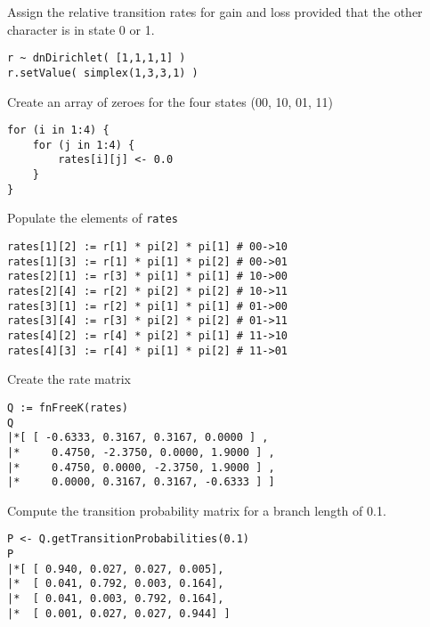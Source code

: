Assign the relative transition rates for gain and loss provided that the other character is in state 0 or 1.

{\tt \begin{snugshade*}
\begin{lstlisting}
r ~ dnDirichlet( [1,1,1,1] )
r.setValue( simplex(1,3,3,1) )
\end{lstlisting}
\end{snugshade*}}

Create an array of zeroes for the four states (00, 10, 01, 11)

{\tt \begin{snugshade*}
\begin{lstlisting}
for (i in 1:4) {
    for (j in 1:4) {
        rates[i][j] <- 0.0
    }
}
\end{lstlisting}
\end{snugshade*}}

Populate the elements of {\tt rates}

{\tt \begin{snugshade*}
\begin{lstlisting}
rates[1][2] := r[1] * pi[2] * pi[1] # 00->10
rates[1][3] := r[1] * pi[1] * pi[2] # 00->01
rates[2][1] := r[3] * pi[1] * pi[1] # 10->00
rates[2][4] := r[2] * pi[2] * pi[2] # 10->11
rates[3][1] := r[2] * pi[1] * pi[1] # 01->00
rates[3][4] := r[3] * pi[2] * pi[2] # 01->11
rates[4][2] := r[4] * pi[2] * pi[1] # 11->10
rates[4][3] := r[4] * pi[1] * pi[2] # 11->01
\end{lstlisting}
\end{snugshade*}}

Create the rate matrix

{\tt \begin{snugshade*}
\begin{lstlisting}
Q := fnFreeK(rates)
Q
|*[ [ -0.6333, 0.3167, 0.3167, 0.0000 ] ,
|*     0.4750, -2.3750, 0.0000, 1.9000 ] ,
|*     0.4750, 0.0000, -2.3750, 1.9000 ] ,
|*     0.0000, 0.3167, 0.3167, -0.6333 ] ]
\end{lstlisting}
\end{snugshade*}}

Compute the transition probability matrix for a branch length of 0.1.

{\tt \begin{snugshade*}
\begin{lstlisting}
P <- Q.getTransitionProbabilities(0.1)
P
|*[ [ 0.940, 0.027, 0.027, 0.005],
|*  [ 0.041, 0.792, 0.003, 0.164],
|*  [ 0.041, 0.003, 0.792, 0.164],
|*  [ 0.001, 0.027, 0.027, 0.944] ]
\end{lstlisting}
\end{snugshade*}}


